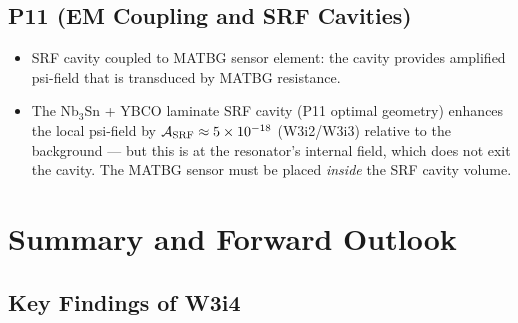 \documentclass[11pt]{article}
\newcommand{\ee}[1]{\times 10^{#1}}
\begin{document}
\subsection{P11 (EM Coupling and SRF Cavities)}

\begin{itemize}
  \item SRF cavity coupled to MATBG sensor element: the cavity provides
    amplified psi-field that is transduced by MATBG resistance.
  \item The Nb$_3$Sn + YBCO laminate SRF cavity (P11 optimal geometry)
    enhances the local psi-field by $\mathcal{A}_{\rm SRF} \approx 5\ee{-18}$
    (W3i2/W3i3) relative to the background --- but this is at the
    resonator's internal field, which does not exit the cavity. The
    MATBG sensor must be placed \emph{inside} the SRF cavity volume.
\end{itemize}

\section{Summary and Forward Outlook}
\label{sec:summary}

\subsection{Key Findings of W3i4}
\end{document}
